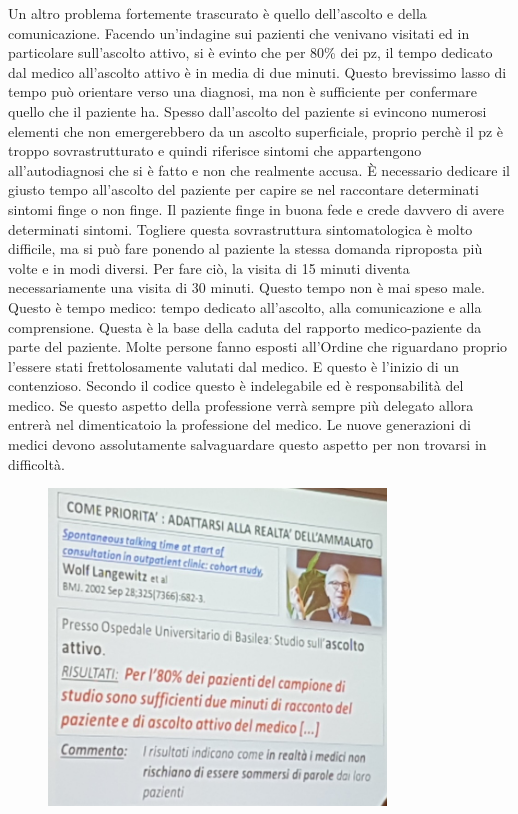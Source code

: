 Un altro problema fortemente trascurato è quello dell'ascolto e della
comunicazione. Facendo un'indagine sui pazienti che venivano visitati ed
in particolare sull'ascolto attivo, si è evinto che per 80\% dei pz, il
tempo dedicato dal medico all'ascolto attivo è in media di due minuti.
Questo brevissimo lasso di tempo può orientare verso una diagnosi, ma
non è sufficiente per confermare quello che il paziente ha. Spesso
dall'ascolto del paziente si evincono numerosi elementi che non
emergerebbero da un ascolto superficiale, proprio perchè il pz è troppo
sovrastrutturato e quindi riferisce sintomi che appartengono
all'autodiagnosi che si è fatto e non che realmente accusa. È necessario
dedicare il giusto tempo all'ascolto del paziente per capire se nel
raccontare determinati sintomi finge o non finge. Il paziente finge in
buona fede e crede davvero di avere determinati sintomi. Togliere questa
sovrastruttura sintomatologica è molto difficile, ma si può fare ponendo
al paziente la stessa domanda riproposta più volte e in modi diversi.
Per fare ciò, la visita di 15 minuti diventa necessariamente una visita
di 30 minuti. Questo tempo non è mai speso male. Questo è tempo medico:
tempo dedicato all'ascolto, alla comunicazione e alla comprensione.
Questa è la base della caduta del rapporto medico-paziente da parte del
paziente. Molte persone fanno esposti all'Ordine che riguardano proprio
l'essere stati frettolosamente valutati dal medico. E questo è l'inizio
di un contenzioso. Secondo il codice questo è indelegabile ed è
responsabilità del medico. Se questo aspetto della professione verrà
sempre più delegato allora entrerà nel dimenticatoio la professione del
medico. Le nuove generazioni di medici devono assolutamente
salvaguardare questo aspetto per non trovarsi in difficoltà.

\begin{figure}[!ht]
\centering
	\includegraphics[width=0.8\textwidth]{29/image5.jpeg}
	\end{figure}
	

